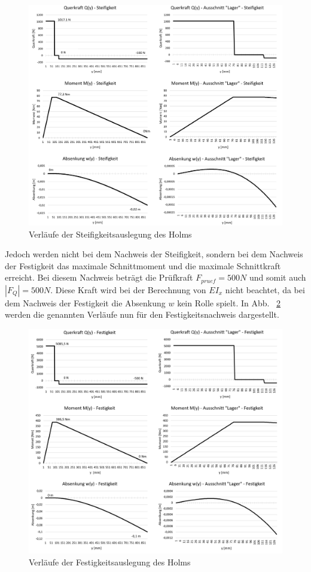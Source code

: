 \begin{figure}
	\includegraphics[width=1.0\textwidth]{Bilder/Grafiken Steifigkeit.png}
	\caption{Verläufe der Steifigkeitsauslegung des Holms}
	\label{fig:Steifigkeitsauslegung}
\end{figure}

\noindent Jedoch werden nicht bei dem Nachweis der Steifigkeit, sondern bei dem Nachweis der Festigkeit das maximale Schnittmoment und die maximale Schnittkraft erreicht. Bei diesem Nachweis beträgt die Prüfkraft $F_{pruef} = 500N$ und somit auch $|F_{Q}| = 500N$. Diese Kraft wird bei der Berechnung von $EI_{x}$ nicht beachtet, da bei dem Nachweis der Festigkeit die Absenkung $w$ kein Rolle spielt. In Abb. ~\ref{fig:Festigkeitsauslegung} werden die genannten Verläufe nun für den Festigkeitsnachweis dargestellt.
\begin{figure}
	\includegraphics[width=1.0\textwidth]{Bilder/Grafiken Festigkeit.png}
	\caption{Verläufe der Festigkeitsauslegung des Holms}
	\label{fig:Festigkeitsauslegung}
\end{figure}

